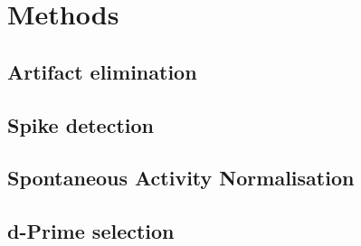 \section{Methods}

\FloatBarrier
\subsection{Artifact elimination}
\label{sec:ma}

\subsection{Spike detection}
\label{sec:ma}

\subsection{Spontaneous Activity Normalisation}
\label{sec:pl_san}

\subsection{d-Prime selection}
\label{sec:pl_dp}
